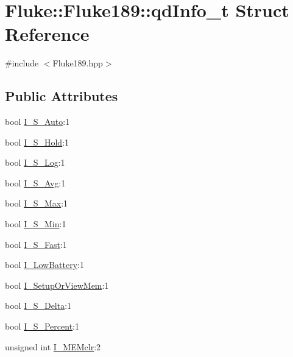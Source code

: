 \hypertarget{structFluke_1_1Fluke189_1_1qdInfo__t}{
\section{Fluke::Fluke189::qdInfo\_\-t Struct Reference}
\label{structFluke_1_1Fluke189_1_1qdInfo__t}
}


{\ttfamily \#include $<$Fluke189.hpp$>$}\subsection*{Public Attributes}
\begin{DoxyCompactItemize}
\item 
bool \hyperlink{structFluke_1_1Fluke189_1_1qdInfo__t_a75c9e0881b6444d045972dddfc2aee9f}{I\_\-S\_\-Auto}:1
\item 
bool \hyperlink{structFluke_1_1Fluke189_1_1qdInfo__t_a930c5fc401b77e853fc9f0db564637db}{I\_\-S\_\-Hold}:1
\item 
bool \hyperlink{structFluke_1_1Fluke189_1_1qdInfo__t_a7dc8ea99bd7b62cd072ab9bbc50c6784}{I\_\-S\_\-Log}:1
\item 
bool \hyperlink{structFluke_1_1Fluke189_1_1qdInfo__t_a71fd33b659921727255d1877005cef72}{I\_\-S\_\-Avg}:1
\item 
bool \hyperlink{structFluke_1_1Fluke189_1_1qdInfo__t_ab2c6db915334d26e1ae1e20e555d038f}{I\_\-S\_\-Max}:1
\item 
bool \hyperlink{structFluke_1_1Fluke189_1_1qdInfo__t_a05535e90048e650e455f4e1bcd95ce98}{I\_\-S\_\-Min}:1
\item 
bool \hyperlink{structFluke_1_1Fluke189_1_1qdInfo__t_ae73230f4bccdb3e6c3008f12aa7bdb06}{I\_\-S\_\-Fast}:1
\item 
bool \hyperlink{structFluke_1_1Fluke189_1_1qdInfo__t_a0d828ad92ec35af5c4114699af266960}{I\_\-LowBattery}:1
\item 
bool \hyperlink{structFluke_1_1Fluke189_1_1qdInfo__t_aa470149681ea3898d86ddb11306eddd8}{I\_\-SetupOrViewMem}:1
\item 
bool \hyperlink{structFluke_1_1Fluke189_1_1qdInfo__t_aed563d34e5b150077208fe97ee8dd47e}{I\_\-S\_\-Delta}:1
\item 
bool \hyperlink{structFluke_1_1Fluke189_1_1qdInfo__t_a7e0cb15be9e813efe89bf94b5bcf3a52}{I\_\-S\_\-Percent}:1
\item 
unsigned int \hyperlink{structFluke_1_1Fluke189_1_1qdInfo__t_a043370629d1031b73e2a9c5ab6bfe3ed}{I\_\-MEMclr}:2
\item 

\end{DoxyCompactItemize}
